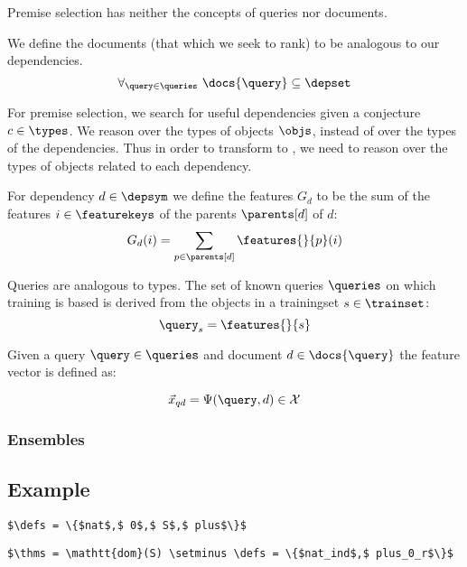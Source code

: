 Premise selection has neither the concepts of queries nor documents.

\begin{definition}
  We define the documents (that which we seek to rank) to be analogous to our dependencies.
  \[
    \forall_{\query \in \queries}~ \docs{\query} \subseteq \depset
  \]
\end{definition}

For premise selection, we search for useful dependencies given a conjecture $c \in \types$.
We reason over the types of objects $\objs$, instead of over the types of the dependencies.
Thus in order to transform to \ltr, we need to reason over the types of objects related to each dependency.

\begin{definition}
  For dependency $d \in \depsym$ we define the features $G_d$ to be the sum of
  the features $i \in \featurekeys$ of the parents $\parents[d]$ of $d$:
  \[
    G_d(i) = \sum_{p \in \parents[d]} \features{}{p}(i)
  \]
\end{definition}

\begin{definition}
  Queries are analogous to types.
  The set of known queries $\queries$ on which training is based is derived from the objects
  in a trainingset $s \in \trainset$:
  \[
    \query_s = \features{}{s}
  \]
\end{definition}

\begin{definition}
  Given a query $\query \in \queries$ and document $d \in \docs{\query}$ the feature
  vector is defined as:

  \[
    {\vec{x}}_{q d} = \Psi(\query, d) \in \mathcal{X}
  \]
\end{definition}



\subsubsection{Ensembles}

\subsection{Example}

\begin{lstlisting}[language=Coq, mathescape, frame=none]
$\defs = \{$nat$,$ 0$,$ S$,$ plus$\}$
\end{lstlisting}

\begin{lstlisting}[language=Coq, mathescape, frame=none]
$\thms = \mathtt{dom}(S) \setminus \defs = \{$nat_ind$,$ plus_0_r$\}$
\end{lstlisting}
